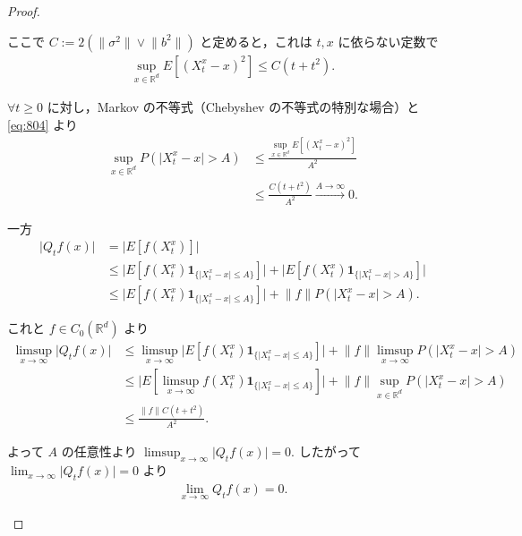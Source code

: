 \documentclass{jsarticle}
\begin{document}
\begin{proof}
\begin{enumerate}[label=(\arabic*)]
\begin{enumerate}[label=(\roman*)]
            ここで $C:=2(\lVert \sigma^2\rVert\vee\lVert b^2\rVert)$ と定めると，これは $t, x$ に依らない定数で
            \setcounter{equation}{3}
            \begin{align}
                \sup_{x\in\mathbb{R}^d}E[(X_{t}^{x}-x)^2]
                \le C(t+t^2).
                \label{eq:804}
            \end{align}

            $\forall t\ge0$ に対し，Markov の不等式（Chebyshev の不等式の特別な場合）と \eqref{eq:804} より
            \begin{align}
                \sup_{x\in\mathbb{R}^d}P(\lvert X_{t}^{x}-x\rvert>A)
                &\le \frac{\sup_{x\in\mathbb{R}^d}E[(X_{t}^{x}-x)^2]}{A^2} \\
                &\le \frac{C(t+t^2)}{A^2}\xrightarrow{A\to\infty}0.
            \end{align}

            一方
            \begin{align}
                \lvert Q_{t}f(x)\rvert
                &= \lvert E[f(X_{t}^{x})]\rvert \\
                &\le \lvert E[f(X_{t}^{x})\bm{1}_{\{\lvert X_{t}^{x}-x\rvert\le A\}}]\rvert
                + \lvert E[f(X_{t}^{x})\bm{1}_{\{\lvert X_{t}^{x}-x\rvert>A\}}]\rvert \\
                &\le \lvert E[f(X_{t}^{x})\bm{1}_{\{\lvert X_{t}^{x}-x\rvert\le A\}}]\rvert
                + \lVert f\rVert P(\lvert X_{t}^{x}-x\rvert>A).
            \end{align}

            これと $f\in C_{0}(\mathbb{R}^d)$ より
            \begin{align}
                \limsup_{x\to\infty}\lvert Q_{t}f(x)\rvert
                &\le \limsup_{x\to\infty}\lvert E[f(X_{t}^{x})\bm{1}_{\{\lvert X_{t}^{x}-x\rvert\le A\}}]\rvert
                + \lVert f\rVert \limsup_{x\to\infty}P(\lvert X_{t}^{x}-x\rvert>A) \\
                &\le \lvert E[\limsup_{x\to\infty}f(X_{t}^{x})\bm{1}_{\{\lvert X_{t}^{x}-x\rvert\le A\}}]\rvert
                + \lVert f\rVert \sup_{x\in\mathbb{R}^d}P(\lvert X_{t}^{x}-x\rvert>A) \\
                &\le \frac{\lVert f\rVert C(t+t^2)}{A^2}.
            \end{align}

            よって $A$ の任意性より $\limsup_{x\to\infty}\lvert Q_{t}f(x)\rvert=0.$
            したがって $\lim_{x\to\infty}\lvert Q_{t}f(x)\rvert=0$ より 
            \begin{align}
                \lim_{x\to\infty}Q_{t}f(x)=0.
            \end{align}


\end{enumerate}
\end{enumerate}
\end{proof}
\end{document}
